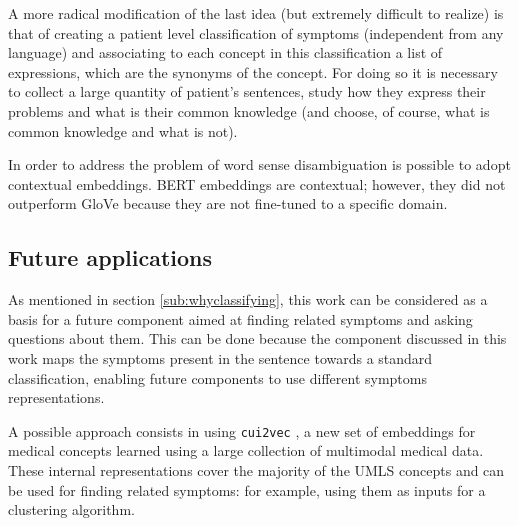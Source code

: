 A more radical modification of the last idea (but extremely difficult to realize) is that of creating a patient level classification of symptoms (independent from any language) and associating to each concept in this classification a list of expressions, which are the synonyms of the concept. For doing so it is necessary to collect a large quantity of patient's sentences, study how they express their problems and what is their common knowledge (and choose, of course, what is common knowledge and what is not).

In order to address the problem of word sense disambiguation is possible to adopt contextual embeddings. BERT embeddings are contextual; however, they did not outperform GloVe because they are not fine-tuned to a specific domain.

\subsection*{Future applications}
As mentioned in section \ref{sub:whyclassifying}, this work can be considered as a basis for a future component aimed at finding related symptoms and asking questions about them. This can be done because the component discussed in this work maps the symptoms present in the sentence towards a standard classification, enabling future components to use different symptoms representations.

A possible approach consists in using \texttt{cui2vec} \cite{cui2vec}, a new set of embeddings for medical concepts learned using a large collection of multimodal medical data. These internal representations cover the majority of the UMLS concepts and can be used for finding related symptoms: for example, using them as inputs for a clustering algorithm.




